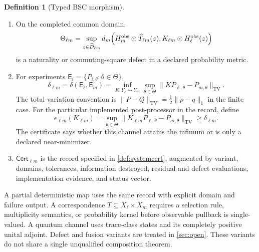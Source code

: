 \documentclass[11pt,a4paper]{article}
\theoremstyle{definition}
\newtheorem{definition}{Definition}[section]
\theoremstyle{plain}
\theoremstyle{remark}
\newcommand{\TV}{\mathrm{TV}}
\newcommand{\Cert}{\mathsf{Cert}}
\begin{document}
\begin{definition}[Typed BSC morphism]
\begin{enumerate}
conditions.
\item On the completed common domain,
\[
\Theta_{\ell m}
=\sup_{z\in\widehat D_{\ell m}} d_m\!\left(
H_m^{\rm obs}\odot\widehat T_{\ell m}(z),
K_{\ell m}\odot H_\ell^{\rm obs}(z)
\right)
\]
is a naturality or commuting-square defect in a declared probability metric.
\item For experiments
\(\mathsf E_i=\{P_{i,\theta}:\theta\in\Theta\}\),
\[
\delta_{\ell m}
=\delta(\mathsf E_\ell,\mathsf E_m)
=\inf_{K:Y_\ell\rightsquigarrow Y_m}
\sup_{\theta\in\Theta}
\|K P_{\ell,\theta}-P_{m,\theta}\|_{\TV}.
\]
The total-variation convention is
\(\|P-Q\|_{\TV}=\frac12\|p-q\|_1\) in the finite case.
For the particular implemented post-processor in the record, define
\[
e_{\ell m}(K_{\ell m})
=\sup_{\theta\in\Theta}
\|K_{\ell m}P_{\ell,\theta}-P_{m,\theta}\|_{\TV}
\ge\delta_{\ell m}.
\]
The certificate says whether this channel attains the infimum or is only a
declared near-minimizer.
\item \(\Cert_{\ell m}\) is the record specified in
\cref{def:systemcert}, augmented by variant, domains, tolerances, information
destroyed, residual and defect evaluations, implementation evidence, and
status vector.
\end{enumerate}
\end{definition}

A partial deterministic map uses the same record with explicit domain and
failure output.  A correspondence \(T\subseteq X_\ell\times X_m\) requires a
selection rule, multiplicity semantics, or probability kernel before
observable pullback is single-valued.  A quantum channel uses trace-class
states and its completely positive unital adjoint.  Defect and fusion variants
are treated in \cref{sec:open}.  These variants do not share a single
unqualified composition theorem.
\end{document}
